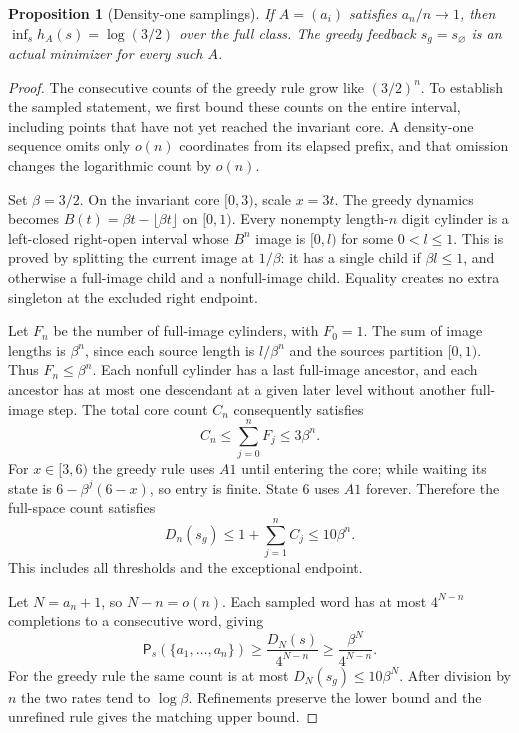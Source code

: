 \documentclass[11pt,reqno]{amsart}
\numberwithin{equation}{section}
\newtheorem{proposition}[theorem]{Proposition}
\theoremstyle{definition}
\theoremstyle{definition}
\newcommand{\Patt}{\mathsf P}
\begin{document}
\begin{proposition}[Density-one samplings]\label{prop:density-one}
If $A=(a_i)$ satisfies $a_n/n\to1$, then
$\inf_s h_A(s)=\log(3/2)$ over the full class.
The greedy feedback $s_g=s_\varnothing$ is an actual minimizer
for every such $A$.
\end{proposition}
\begin{proof}
The consecutive counts of the greedy rule grow like $(3/2)^n$.
To establish the sampled statement, we first bound these counts on
the entire interval, including points that have not yet reached the
invariant core. A density-one sequence omits only $o(n)$ coordinates
from its elapsed prefix, and that omission changes the logarithmic
count by $o(n)$.

Set $\beta=3/2$. On the invariant core $[0,3)$, scale $x=3t$.
The greedy dynamics becomes $B(t)=\beta t-\lfloor\beta t\rfloor$
on $[0,1)$. Every nonempty length-$n$ digit cylinder is a
left-closed right-open interval whose $B^n$ image is $[0,l)$
for some $0<l\le1$. This is proved by splitting the current
image at $1/\beta$: it has a single child if $\beta l\le1$,
and otherwise a full-image child and a nonfull-image child.
Equality creates no extra singleton at the excluded right endpoint.

Let $F_n$ be the number of full-image cylinders, with $F_0=1$.
The sum of image lengths is $\beta^n$, since each source length
is $l/\beta^n$ and the sources partition $[0,1)$. Thus
$F_n\le\beta^n$. Each nonfull cylinder has a last full-image
ancestor, and each ancestor has at most one descendant at a given
later level without another full-image step. The total core count
$C_n$ consequently satisfies
\[
 C_n\le\sum_{j=0}^n F_j\le3\beta^n.
\]
For $x\in[3,6)$ the greedy rule uses $A1$ until
entering the core; while waiting its state is
$6-\beta^j(6-x)$, so entry is finite. State $6$ uses $A1$
forever. Therefore the full-space count satisfies
\[
 D_n(s_g)\le1+\sum_{j=1}^n C_j\le10\beta^n.
\]
This includes all thresholds and the exceptional endpoint.

Let $N=a_n+1$, so $N-n=o(n)$. Each sampled word has at most
$4^{N-n}$ completions to a consecutive word, giving
\[
 \Patt_s(\{a_1,\ldots,a_n\})\ge
 \frac{D_N(s)}{4^{N-n}}\ge\frac{\beta^N}{4^{N-n}}.
\]
For the greedy rule the same count is at most
$D_N(s_g)\le10\beta^N$. After division by $n$ the two
rates tend to $\log\beta$. Refinements preserve the lower
bound and the unrefined rule gives the matching upper bound.
\end{proof}
\end{document}
